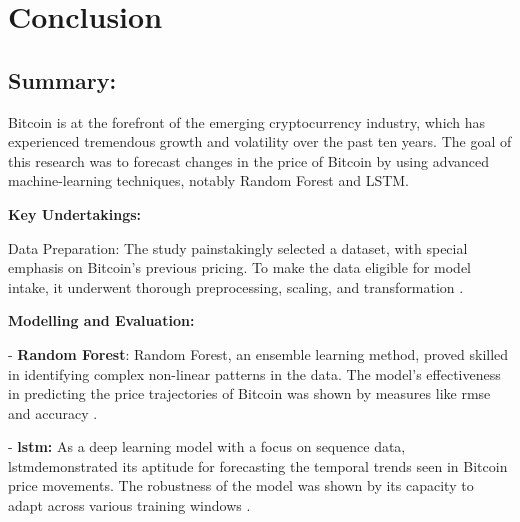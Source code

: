 \def\baselinestretch{1}

\chapter{Conclusion}

\def\baselinestretch{1.66}


 

\goodbreak




\section{Summary:}
Bitcoin is at the forefront of the emerging cryptocurrency industry, which has experienced tremendous growth and volatility over the past ten years. The goal of this research was to forecast changes in the price of Bitcoin by using advanced machine-learning techniques, notably Random Forest and LSTM.

\textbf{Key Undertakings:}

Data Preparation: The study painstakingly selected a dataset, with special emphasis on Bitcoin's previous pricing. To make the data eligible for model intake, it underwent thorough preprocessing, scaling, and transformation \citep{needham2007primer}.

\textbf{Modelling and Evaluation:}

-	\textbf{Random Forest}: Random Forest, an ensemble learning method, proved skilled in identifying complex non-linear patterns in the data. The model's effectiveness in predicting the price trajectories of Bitcoin was shown by measures like \gls{rmse} and accuracy \citep{breiman_random_2001}.

-	\textbf{\gls{lstm}:} As a deep learning model with a focus on sequence data, \gls{lstm}demonstrated its aptitude for forecasting the temporal trends seen in Bitcoin price movements. The robustness of the model was shown by its capacity to adapt across various training windows \citep{Hochreiter1997LongSM}.

